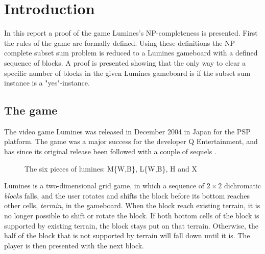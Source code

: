 \section{Introduction}

In this report a proof of the game Lumines's NP-completeness is presented. First the rules of the game are formally defined. Using these definitions the NP-complete subset sum problem is reduced to a Lumines gameboard with a defined sequence of blocks. A proof is presented showing that the only way to clear a specific number of blocks in the given Lumines gameboard is if the subset sum instance is a "yes"-instance.

\subsection{The game}
The video game Lumines was released in December 2004 in Japan for the PSP platform. The game was a major success for the developer Q Entertainment, and has since its original release been followed with a couple of sequels \cite{wiki:lumines}.
\begin{figure}[H]
    \centering
    \caption{The six pieces of lumines: M\{W,B\}, L\{W,B\}, H and X}
    \label{fig:pieces}
\end{figure}

Lumines is a two-dimensional grid game, in which a sequence of $2 \times 2$ dichromatic \textit{blocks} falls, and the user rotates and shifts the block before its bottom  reaches other cells, \textit{terrain}, in the gameboard. When the block reach existing terrain, it is no longer possible to shift or rotate the block. If both bottom cells of the block is supported by existing terrain, the block stays put on that terrain. Otherwise, the half of the block that is not supported by terrain will fall down until it is. The player is then presented with the next block.

